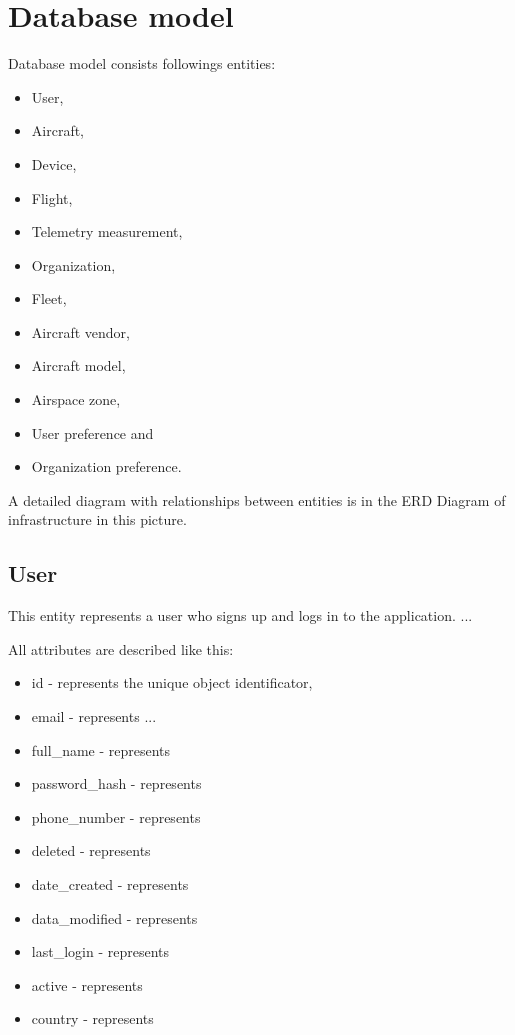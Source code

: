 \section{Database model}\label{sec:database-model}
Database model consists followings entities:
\begin{itemize}
    \item User,
    \item Aircraft,
    \item Device,
    \item Flight,
    \item Telemetry measurement,
    \item Organization,
    \item Fleet,
    \item Aircraft vendor,
    \item Aircraft model,
    \item Airspace zone,
    \item User preference and
    \item Organization preference.
\end{itemize}
A detailed diagram with relationships between entities is in the ERD Diagram of infrastructure in this picture\cite{fig:erd-diagram}.

\subsection{User}\label{subsec:user}
This entity represents a user who signs up and logs in to the application.
...

All attributes are described like this:
\begin{itemize}
    \item id - represents the unique object identificator,
    \item email - represents ...
    \item full\_name - represents
    \item password\_hash - represents
    \item phone\_number - represents
    \item deleted - represents
    \item date\_created - represents
    \item data\_modified - represents
    \item last\_login - represents
    \item active - represents
    \item country - represents
\end{itemize}

